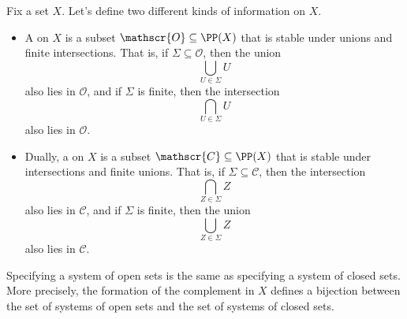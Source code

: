 \begin{dfn}
	Fix a set $X$.
	Let's define two different kinds of information on $X$.
	\begin{itemize}
		\item A  on $X$ is a subset $\mathscr{O}\subseteq\PP(X)$ that is stable under unions and finite intersections.
			That is, if $\Sigma\subseteq \mathscr{O}$, then the union
			\[
				\bigcup_{U\in \Sigma} U
			\]
			also lies in $ \mathscr{O}$,
			and if $\Sigma$ is finite, then the intersection
			\[
				\bigcap_{U\in \Sigma} U
			\]
			also lies in $\mathscr{O}$.
		\item Dually, a  on $X$ is a subset $\mathscr{C}\subseteq\PP(X)$ that is stable under intersections and finite unions.
			That is, if $\Sigma \subseteq\mathscr{C}$, then the intersection
			\[
				\bigcap_{Z\in\Sigma} Z
			\]
			also lies in $\mathscr{C}$,
			and if $\Sigma$ is finite, then the union
			\[
				\bigcup_{Z\in\Sigma} Z
			\]
			also lies in $\mathscr{C}$.
	\end{itemize}
\end{dfn}

Specifying a system of open sets is the same as specifying a system of closed sets.
More precisely, the formation of the complement in $X$ defines a bijection between the set of systems of open sets and the set of systems of closed sets.


